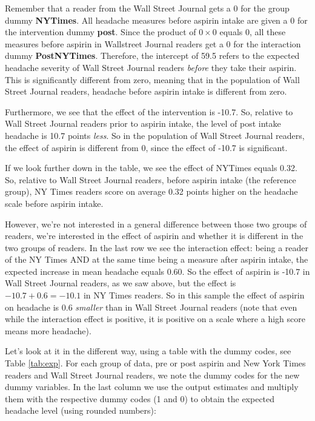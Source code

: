 \documentclass[]{book}\usepackage[]{graphicx}\usepackage[]{color}
\begin{document}
Remember that a reader from the Wall Street Journal gets a 0 for the group dummy \textbf{NYTimes}. All headache measures before aspirin intake are given a 0 for the intervention dummy \textbf{post}. 
Since the product of $ 0\times 0$ equals 0, all these measures before aspirin in Wallstreet Journal readers get a 0 for the interaction dummy \textbf{PostNYTimes}.
Therefore, the intercept of 59.5 refers to the expected headache severity of Wall Street Journal readers \textit{before} they take their aspirin. This is significantly different from zero, meaning that in the population of Wall Street Journal readers, headache before aspirin intake is different from zero.

Furthermore, we see that the effect of the intervention is -10.7. So, relative to Wall Street Journal readers prior to aspirin intake, the level of post intake headache is 10.7 points \textit{less}. So in the population of Wall Street Journal readers, the effect of aspirin is different from 0, since the effect of -10.7 is significant. 

If we look further down in the table, we see the effect of NYTimes equals 0.32. So, relative to Wall Street Journal readers, before aspirin intake (the reference group), NY Times readers score on average 0.32 points higher on the headache scale before aspirin intake. 

However, we're not interested in a general difference between those two groups of readers, we're interested in the effect of aspirin and whether it is different in the two groups of readers. In the last row we see the interaction effect: being a reader of the NY Times AND at the same time being a measure after aspirin intake, the expected increase in mean headache equals 0.60. So the effect of aspirin is -10.7 in Wall Street Journal readers, as we saw above, but the  effect is $-10.7 + 0.6 = -10.1$ in NY Times readers. So in this sample the effect of aspirin on headache is 0.6 \textit{smaller} than in Wall Street Journal readers (note that even while the interaction effect is positive, it is positive on a scale where a high score means more headache). 


Let's look at it in the different way, using a table with the dummy codes, see Table \ref{tab:exp}. For each group of data, pre or post aspirin and New York Times readers and Wall Street Journal readers, we note the dummy codes for the new dummy variables. In the last column we use the output estimates and multiply them with the respective dummy codes (1 and 0) to obtain the expected headache level (using rounded numbers):
\end{document}
